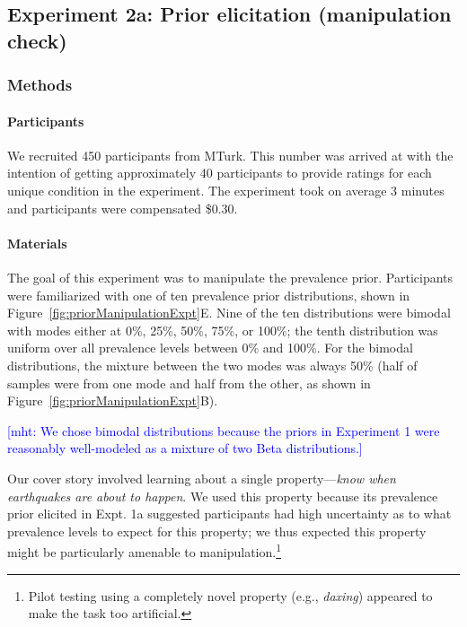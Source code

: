 \documentclass[floatsintext,doc]{apa6}
\let\oldparagraph\paragraph
\renewcommand{\paragraph}[1]{\oldparagraph{#1}\mbox{}}
\let\rmarkdownfootnote\footnote%
\def\footnote{\protect\rmarkdownfootnote}
\newcommand{\mht}[1]{{\textcolor{Blue}{[mht: #1]}}}
\begin{document}
\hypertarget{experiment-2a-prior-elicitation-manipulation-check}{%
\subsection{Experiment 2a: Prior elicitation (manipulation check)}\label{experiment-2a-prior-elicitation-manipulation-check}}

\hypertarget{methods-2}{%
\subsubsection{Methods}\label{methods-2}}

\hypertarget{participants-3}{%
\paragraph{Participants}\label{participants-3}}

We recruited 450 participants from MTurk.
This number was arrived at with the intention of getting approximately 40 participants to provide ratings for each unique condition in the experiment.
The experiment took on average 3 minutes and participants were compensated \$0.30.

\hypertarget{materials-1}{%
\paragraph{Materials}\label{materials-1}}

The goal of this experiment was to manipulate the prevalence prior.
Participants were familiarized with one of ten prevalence prior distributions, shown in Figure~\ref{fig:priorManipulationExpt}E.
Nine of the ten distributions were bimodal with modes either at 0\%, 25\%, 50\%, 75\%, or 100\%; the tenth distribution was uniform over all prevalence levels between 0\% and 100\%.
For the bimodal distributions, the mixture between the two modes was always 50\% (half of samples were from one mode and half from the other, as shown in Figure~\ref{fig:priorManipulationExpt}B).

\mht{We chose bimodal distributions because the priors in Experiment 1 were reasonably well-modeled as a mixture of two Beta distributions.}

Our cover story involved learning about a single property---\emph{know when earthquakes are about to happen}.
We used this property because its prevalence prior elicited in Expt. 1a suggested participants had high uncertainty as to what prevalence levels to expect for this property; we thus expected this property might be particularly amenable to manipulation.\footnote{Pilot testing using a completely novel property (e.g., \emph{daxing}) appeared to make the task too artificial. }
\end{document}
